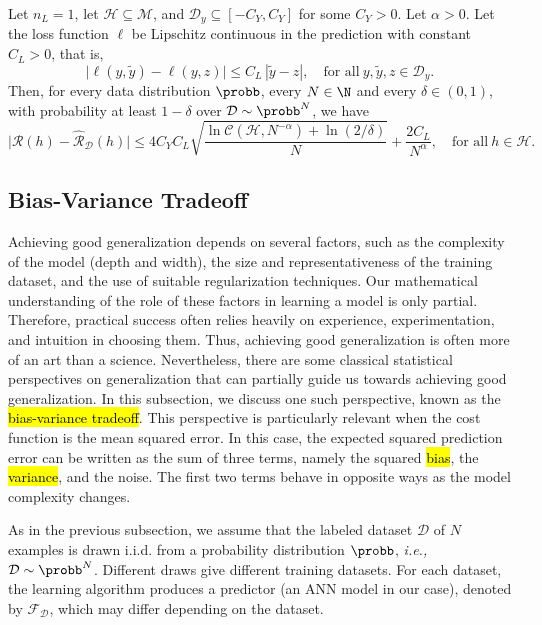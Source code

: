 \begin{theorem}\label{covering.number.bound.thm}

Let $n_L=1$, let $\mathcal{H}\subseteq\mathcal{M}$, and $\mathcal{D}_y\subseteq[-C_Y,C_Y]$ for some $C_Y>0$.  Let $\alpha>0$.  Let the loss function $\ell$ be Lipschitz continuous in the prediction with constant $C_L>0$, that is,
$$
\big|\ell(y,\tilde{y})-\ell(y,z)\big| \le C_L\,|\tilde{y}-z|, \quad\text{for all}~y,\tilde{y},z\in\mathcal{D}_y.
$$
Then, for every data distribution $\probb$, every $N\in\N$ and every $\delta\in(0,1)$, with probability at least $1-\delta$ over $\mathcal{D}\sim\probb^N$, we have
$$
\big|\mathcal{R}(h)-\widehat{\mathcal{R}}_{\mathcal{D}}(h)\big| \le 4C_YC_L\sqrt{\frac{\ln\mathscr{C}(\mathcal{H},N^{-\alpha}) + \ln(2/\delta)}{N}} + \frac{2C_L}{N^{\alpha}}, \quad\text{for all}~h\in\mathcal{H}.
$$
\end{theorem}

\subsection{Bias-Variance Tradeoff}
\label{bias-variance.tradeoff.subs}

Achieving good generalization depends on several factors, such as the complexity of the model (depth and width), the size and representativeness of the training dataset, and the use of suitable regularization techniques. Our mathematical understanding of the role of these factors in learning a model is only partial. Therefore, practical success often relies heavily on experience, experimentation, and intuition in choosing them. Thus, achieving good generalization is often more of an art than a science. Nevertheless, there are some classical statistical perspectives on generalization that can partially guide us towards achieving good generalization. In this subsection, we discuss one such perspective, known as the \hl{bias-variance tradeoff}. This perspective is particularly relevant when the cost function is the mean squared error.  In this case, the expected squared prediction error can be written as the sum of three terms, namely the squared \hl{bias}, the \hl{variance}, and the noise. The first two terms behave in opposite ways as the model complexity changes.

As in the previous subsection, we assume that the labeled dataset $\mathcal{D}$ of $N$ examples is drawn i.i.d. from a probability distribution $\probb$, \textit{i.e.,} $\mathcal{D} \sim \probb^N$.  Different draws give different training datasets. For each dataset, the learning algorithm produces a predictor (an ANN model in our case), denoted by $\mathscr{F}_{\mathcal{D}}$, which may differ depending on the dataset.

